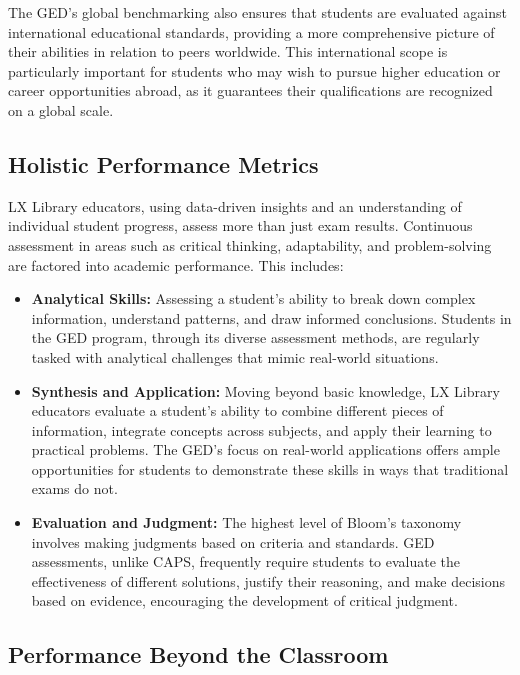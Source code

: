 \documentclass[12pt]{article}
\begin{document}
The GED’s global benchmarking also ensures that students are evaluated against international educational standards, providing a more comprehensive picture of their abilities in relation to peers worldwide. This international scope is particularly important for students who may wish to pursue higher education or career opportunities abroad, as it guarantees their qualifications are recognized on a global scale.

\subsection{Holistic Performance Metrics}

LX Library educators, using data-driven insights and an understanding of individual student progress, assess more than just exam results. Continuous assessment in areas such as critical thinking, adaptability, and problem-solving are factored into academic performance. This includes:
\begin{itemize}
    \item \textbf{Analytical Skills:} Assessing a student’s ability to break down complex information, understand patterns, and draw informed conclusions. Students in the GED program, through its diverse assessment methods, are regularly tasked with analytical challenges that mimic real-world situations.
    
    \item \textbf{Synthesis and Application:} Moving beyond basic knowledge, LX Library educators evaluate a student’s ability to combine different pieces of information, integrate concepts across subjects, and apply their learning to practical problems. The GED’s focus on real-world applications offers ample opportunities for students to demonstrate these skills in ways that traditional exams do not.
    
    \item \textbf{Evaluation and Judgment:} The highest level of Bloom’s taxonomy involves making judgments based on criteria and standards. GED assessments, unlike CAPS, frequently require students to evaluate the effectiveness of different solutions, justify their reasoning, and make decisions based on evidence, encouraging the development of critical judgment.
\end{itemize}



\subsection{Performance Beyond the Classroom}
\end{document}
